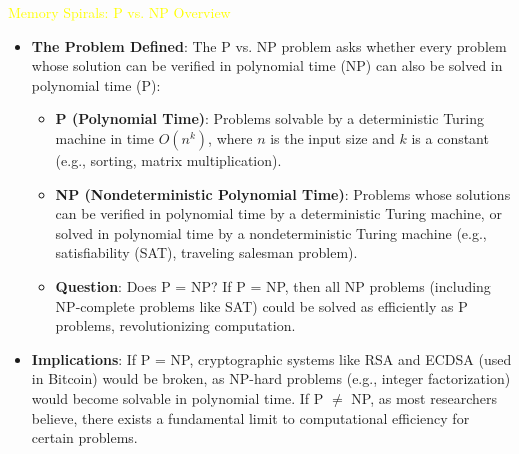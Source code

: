 \textcolor{yellow}{ Memory Spirals: P vs. NP Overview } \\
\begin{itemize}
    \item \texttt{} \textbf{The Problem Defined}: The P vs. NP problem asks whether every problem whose solution can be verified in polynomial time (NP) can also be solved in polynomial time (P):
    \begin{itemize}
        \item \textbf{P (Polynomial Time)}: Problems solvable by a deterministic Turing machine in time \(O(n^k)\), where \(n\) is the input size and \(k\) is a constant (e.g., sorting, matrix multiplication).
        \item \textbf{NP (Nondeterministic Polynomial Time)}: Problems whose solutions can be verified in polynomial time by a deterministic Turing machine, or solved in polynomial time by a nondeterministic Turing machine (e.g., satisfiability (SAT), traveling salesman problem).
        \item \textbf{Question}: Does P = NP? If P = NP, then all NP problems (including NP-complete problems like SAT) could be solved as efficiently as P problems, revolutionizing computation.
    \end{itemize}
    \item \texttt{} \textbf{Implications}: If P = NP, cryptographic systems like RSA and ECDSA (used in Bitcoin) would be broken, as NP-hard problems (e.g., integer factorization) would become solvable in polynomial time. If P \(\neq\) NP, as most researchers believe, there exists a fundamental limit to computational efficiency for certain problems.
\end{itemize}

